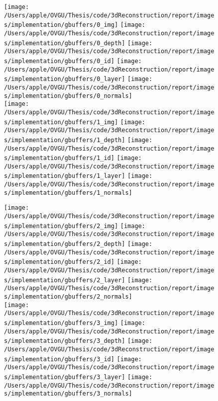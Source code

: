 \begin{figure}
    \centering
    \texttt{[image: /Users/apple/OVGU/Thesis/code/3dReconstruction/report/images/implementation/gbuffers/0\_img]}
    \texttt{[image: /Users/apple/OVGU/Thesis/code/3dReconstruction/report/images/implementation/gbuffers/0\_depth]}
    \texttt{[image: /Users/apple/OVGU/Thesis/code/3dReconstruction/report/images/implementation/gbuffers/0\_id]}
    \texttt{[image: /Users/apple/OVGU/Thesis/code/3dReconstruction/report/images/implementation/gbuffers/0\_layer]}
    \texttt{[image: /Users/apple/OVGU/Thesis/code/3dReconstruction/report/images/implementation/gbuffers/0\_normals]}\\
    \vspace{0.1cm}
    \texttt{[image: /Users/apple/OVGU/Thesis/code/3dReconstruction/report/images/implementation/gbuffers/1\_img]}
    \texttt{[image: /Users/apple/OVGU/Thesis/code/3dReconstruction/report/images/implementation/gbuffers/1\_depth]}
    \texttt{[image: /Users/apple/OVGU/Thesis/code/3dReconstruction/report/images/implementation/gbuffers/1\_id]}
    \texttt{[image: /Users/apple/OVGU/Thesis/code/3dReconstruction/report/images/implementation/gbuffers/1\_layer]}
    \texttt{[image: /Users/apple/OVGU/Thesis/code/3dReconstruction/report/images/implementation/gbuffers/1\_normals]}\\
    \vspace{0.1cm}

    \texttt{[image: /Users/apple/OVGU/Thesis/code/3dReconstruction/report/images/implementation/gbuffers/2\_img]}
    \texttt{[image: /Users/apple/OVGU/Thesis/code/3dReconstruction/report/images/implementation/gbuffers/2\_depth]}
    \texttt{[image: /Users/apple/OVGU/Thesis/code/3dReconstruction/report/images/implementation/gbuffers/2\_id]}
    \texttt{[image: /Users/apple/OVGU/Thesis/code/3dReconstruction/report/images/implementation/gbuffers/2\_layer]}
    \texttt{[image: /Users/apple/OVGU/Thesis/code/3dReconstruction/report/images/implementation/gbuffers/2\_normals]}\\
    \vspace{0.1cm}
    \texttt{[image: /Users/apple/OVGU/Thesis/code/3dReconstruction/report/images/implementation/gbuffers/3\_img]}
    \texttt{[image: /Users/apple/OVGU/Thesis/code/3dReconstruction/report/images/implementation/gbuffers/3\_depth]}
    \texttt{[image: /Users/apple/OVGU/Thesis/code/3dReconstruction/report/images/implementation/gbuffers/3\_id]}
    \texttt{[image: /Users/apple/OVGU/Thesis/code/3dReconstruction/report/images/implementation/gbuffers/3\_layer]}
    \texttt{[image: /Users/apple/OVGU/Thesis/code/3dReconstruction/report/images/implementation/gbuffers/3\_normals]}\\
    \vspace{0.1cm}


\end{figure}
